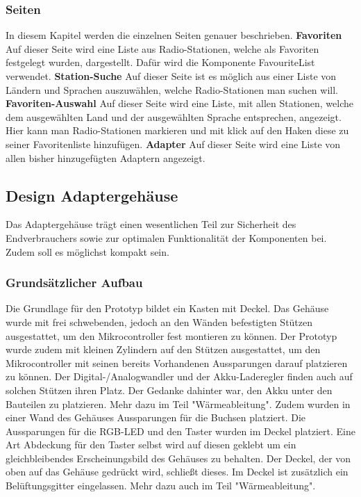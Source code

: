 \documentclass[]{article}
\begin{document}
\subsubsection{Seiten}
In diesem Kapitel werden die einzelnen Seiten genauer beschrieben.
\textbf{Favoriten}
Auf dieser Seite wird eine Liste aus Radio-Stationen, welche als Favoriten festgelegt wurden, dargestellt. Dafür wird die Komponente FavouriteList verwendet.
\textbf{Station-Suche}
Auf dieser Seite ist es möglich aus einer Liste von Ländern und Sprachen auszuwählen, welche Radio-Stationen man suchen will.
\textbf{Favoriten-Auswahl}
Auf dieser Seite wird eine Liste, mit allen Stationen, welche dem ausgewählten Land und der ausgewählten Sprache entsprechen, angezeigt. Hier kann man Radio-Stationen markieren und mit klick auf den Haken diese zu seiner Favoritenliste hinzufügen.
\textbf{Adapter}
Auf dieser Seite wird eine Liste von allen bisher hinzugefügten Adaptern angezeigt.
\subsection{Design Adaptergehäuse}
Das Adaptergehäuse trägt einen wesentlichen Teil zur Sicherheit des Endverbrauchers sowie zur optimalen Funktionalität der Komponenten bei. Zudem soll es möglichst kompakt sein.
\subsubsection{Grundsätzlicher Aufbau}
Die Grundlage für den Prototyp bildet ein Kasten mit Deckel.\newline
Das Gehäuse wurde mit frei schwebenden, jedoch an den Wänden befestigten Stützen ausgestattet, um den Mikrocontroller fest montieren zu können. Der Prototyp wurde zudem mit kleinen Zylindern auf den Stützen ausgestattet, um den Mikrocontroller mit seinen bereits Vorhandenen Aussparungen darauf platzieren zu können. Der Digital-/Analogwandler und der Akku-Laderegler finden auch auf solchen Stützen ihren Platz. Der Gedanke dahinter war, den Akku unter den Bauteilen zu platzieren. Mehr dazu im Teil "Wärmeableitung". Zudem wurden in einer Wand des Gehäuses Aussparungen für die Buchsen platziert. Die Aussparungen für die RGB-LED und den Taster wurden im Deckel platziert. Eine Art Abdeckung für den Taster selbst wird auf diesen geklebt um ein gleichbleibendes Erscheinungsbild des Gehäuses zu behalten. Der Deckel, der von oben auf das Gehäuse gedrückt wird, schließt dieses. Im Deckel ist zusätzlich ein Belüftungsgitter eingelassen. Mehr dazu auch im Teil "Wärmeableitung".
\end{document}

